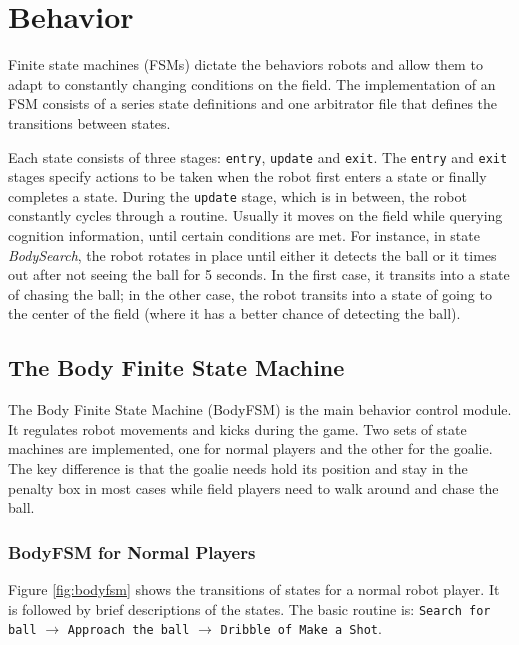 \documentclass{article}
\begin{document}
\section{Behavior}
	Finite state machines (FSMs) dictate the behaviors robots and allow them to adapt to constantly changing conditions on the field.  The implementation of an FSM consists of a series state definitions and one arbitrator file that defines the transitions between states. 

	Each state consists of three stages:  \texttt{entry}, \texttt{update} and \texttt{exit}. The \texttt{entry} and \texttt{exit} stages specify actions to be taken when the robot first enters a state or finally completes a state. During the \texttt{update} stage, which is in between, the robot constantly cycles through a routine. Usually it moves on the field while querying cognition information, until certain conditions are met. For instance, in state \textit{BodySearch}, the robot rotates in place until either it detects the ball or it times out after not seeing the ball for 5 seconds. In the first case, it transits into a state of chasing the ball; in the other case, the robot transits into a state of going to the center of the field (where it has a better chance of detecting the ball).

\subsection{The Body Finite State Machine }
	The Body Finite State Machine (BodyFSM) is the main behavior control module. It regulates robot movements and kicks during the game. Two sets of state machines are implemented, one for normal players and the other for the goalie. The key difference is that the goalie needs hold its position and stay in the penalty box in most cases while field players need to walk around and chase the ball.

\subsubsection{BodyFSM for Normal Players}	
	Figure \ref{fig:bodyfsm} shows the transitions of states for a normal robot player. It is followed by brief descriptions of the states. The basic routine is: \texttt{Search for ball} $\to$ \texttt{Approach the ball} $\to$ \texttt{Dribble of Make a Shot}.
		
\end{document}
